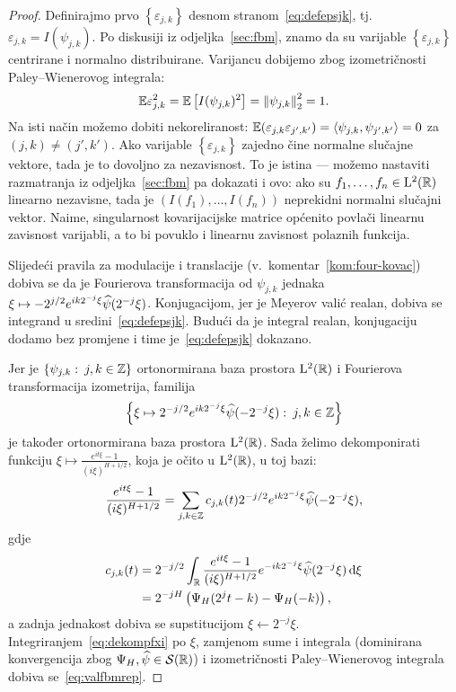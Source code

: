 \documentclass[main.tex]{subfiles}
\begin{document}
\begin{proof}
	Definirajmo prvo  \( \left\{ \varepsilon_{j,k }\right\} \) desnom stranom~\eqref{eq:defepsjk}, tj.\ \( \varepsilon_{j,k} = I(\psi_{j,k}) \).
	Po diskusiji iz odjeljka~\ref{sec:fbm}, znamo da su varijable \( \left\{ \varepsilon_{j,k} \right\} \)
	centrirane i normalno distribuirane. Varijancu dobijemo zbog izometričnosti
	Paley--Wienerovog integrala:
	\begin{equation}
		\mathbb{E}\varepsilon_{j,k}^2 = \mathbb{E} \left[ I(\psi_{j,k})^2 \right]  = \left\lVert\psi_{j,k}\right\rVert^2_2 = 1.
	\end{equation}
	Na isti način možemo dobiti nekoreliranost: \( \mathbb{E} (\varepsilon_{j,k}\varepsilon_{j',k'}) = \left\langle {\psi_{j,k}}, {\psi_{j',k'}} \right\rangle = 0 \) za \( (j,k) \neq (j',k') \). Ako varijable \( \left\{ \varepsilon_{j,k}  \right\} \)
	zajedno čine normalne slučajne vektore, tada je to dovoljno za nezavisnost.
	To je istina --- možemo nastaviti razmatranja iz odjeljka~\ref{sec:fbm} pa dokazati i ovo: ako su \( f_1, \ldots, f_n \in \mathrm{L}^2(\mathbb{R}) \)
	linearno nezavisne, tada je \( \left( I(f_1),\ldots,I(f_n) \right)  \) neprekidni normalni slučajni vektor.
	Naime, singularnost kovarijacijske matrice općenito povlači linearnu zavisnost varijabli, a to bi povuklo i
	linearnu zavisnost polaznih funkcija.

	Slijedeći pravila za modulacije i translacije (v.~komentar~\ref{kom:four-kovac})
	dobiva se da je Fourierova transformacija od \( \psi_{j,k} \) jednaka
	\( \xi \mapsto -2^{j/2}e^{ik2^{-j}\xi}\widehat{\psi}(2^{-j}\xi) \).
	Konjugacijom, jer je Meyerov valić realan,
	dobiva se integrand u sredini~\eqref{eq:defepsjk}.
	Budući da je integral realan, konjugaciju dodamo bez promjene i time
	je~\eqref{eq:defepsjk} dokazano.

	Jer je \( \left\{ \psi_{j,k} \, \colon \, j,k \in \mathbb{Z} \right\} \) ortonormirana baza
	prostora \( \mathrm{L}^2(\mathbb{R}) \) i Fourierova transformacija izometrija, familija
	\[
		\left\{ \xi \mapsto 2^{-j/2} e^{ik2^{-j}\xi}\widehat{\psi}(-2^{-j}\xi) \, \colon \, j,k \in \mathbb{Z} \right\}
	\]
	je također ortonormirana baza prostora \( \mathrm{L}^2(\mathbb{R}) \). Sada želimo dekomponirati
	funkciju \( \xi \mapsto \frac{e^{it\xi}-1}{(i\xi)^{H+1/2}} \), koja je očito u \( \mathrm{L}^2(\mathbb{R}) \), u toj bazi:
	\begin{equation} \label{eq:dekompfxi}
		\frac{e^{it\xi}-1}{(i\xi)^{H+1/2}} =
		\sum_{j,k \in \mathbb{Z}} c_{j,k}(t) 2^{-j/2}e^{ik2^{-j}\xi}\widehat{\psi}(-2^{-j}\xi),
	\end{equation}
	gdje
	\begin{equation}
		\begin{aligned}
			c_{j,k}(t) & = 2^{-j/2} \int_{\mathbb{R}} \frac{e^{it\xi}-1}{(i\xi)^{H+1/2}}e^{-ik2^{-j}\xi}\widehat{\psi}(2^{-j}\xi) \,\mathrm d \xi
			\\ &= 2^{-jH} \left( \Psi_H(2^jt-k)-\Psi_H(-k) \right),
		\end{aligned}
	\end{equation}
	a zadnja jednakost dobiva se supstitucijom \( \xi \leftarrow 2^{-j}\xi \).
	Integriranjem~\eqref{eq:dekompfxi} po \( \xi \), zamjenom sume i integrala (dominirana konvergencija zbog \( \Psi_H, \widehat{\psi} \in \mathcal S(\mathbb{R}) \)) i izometričnosti Paley--Wienerovog integrala
	dobiva se~\eqref{eq:valfbmrep}.


\end{proof}
\end{document}
